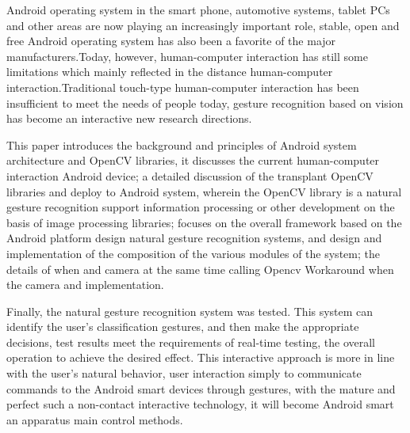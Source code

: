 \begin{englishabstract}
Android operating system in the smart phone, automotive systems, tablet PCs and other areas are now playing an increasingly important role, stable, open and free Android operating system has also been a favorite of the major manufacturers.Today, however, human-computer interaction has still some limitations which mainly reflected in the distance human-computer interaction.Traditional touch-type human-computer interaction has been insufficient to meet the needs of people today, gesture recognition based on vision has become an interactive new research directions.

This paper introduces the background and principles of Android system architecture and OpenCV libraries, it discusses the current human-computer interaction Android device; a detailed discussion of the transplant OpenCV libraries and deploy to Android system, wherein the OpenCV library is a natural gesture recognition support information processing or other development on the basis of image processing libraries; focuses on the overall framework based on the Android platform design natural gesture recognition systems, and design and implementation of the composition of the various modules of the system; the details of when and camera at the same time calling Opencv Workaround when the camera and implementation.

Finally, the natural gesture recognition system was tested. This system can identify the user's classification gestures, and then make the appropriate decisions, test results meet the requirements of real-time testing, the overall operation to achieve the desired effect. This interactive approach is more in line with the user's natural behavior, user interaction simply to communicate commands to the Android smart devices through gestures, with the mature and perfect such a non-contact interactive technology, it will become Android smart an apparatus main control methods.

\end{englishabstract}
